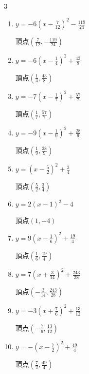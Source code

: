 \begin{multicols}{3}
\begin{enumerate}
  \item $\displaystyle y=-6\left( x-\frac{7}{12}\right)^{2}-\frac{119}{24}$

        $\displaystyle 頂点\left( \frac{7}{12} , -\frac{119}{24} \right)$

  \item $\displaystyle y=-6\left( x-\frac{1}{4}\right)^{2}+\frac{43}{8}$

        $\displaystyle 頂点\left( \frac{1}{4} , \frac{43}{8} \right)$

  \item $\displaystyle y=-7\left( x-\frac{1}{7}\right)^{2}+\frac{57}{7}$

        $\displaystyle 頂点\left( \frac{1}{7} , \frac{57}{7} \right)$

  \item $\displaystyle y=-9\left( x-\frac{1}{9}\right)^{2}+\frac{28}{9}$

        $\displaystyle 頂点\left( \frac{1}{9} , \frac{28}{9} \right)$

  \item $\displaystyle y=\left( x-\frac{5}{2}\right)^{2}+\frac{3}{4}$

        $\displaystyle 頂点\left( \frac{5}{2} , \frac{3}{4} \right)$

  \item $\displaystyle y=2\left( x-1\right)^{2}-4$

        $\displaystyle 頂点\left( 1 , -4 \right)$

\columnbreak %

  \item $\displaystyle y=9\left( x-\frac{1}{6}\right)^{2}+\frac{19}{4}$

        $\displaystyle 頂点\left( \frac{1}{6} , \frac{19}{4} \right)$

  \item $\displaystyle y=7\left( x+\frac{3}{14}\right)^{2}+\frac{243}{28}$

        $\displaystyle 頂点\left( -\frac{3}{14} , \frac{243}{28} \right)$

  \item $\displaystyle y=-3\left( x+\frac{7}{6}\right)^{2}+\frac{13}{12}$

        $\displaystyle 頂点\left( -\frac{7}{6} , \frac{13}{12} \right)$

  \item $\displaystyle y=-\left( x-\frac{7}{2}\right)^{2}+\frac{49}{4}$

        $\displaystyle 頂点\left( \frac{7}{2} , \frac{49}{4} \right)$


\end{enumerate}
\end{multicols}
